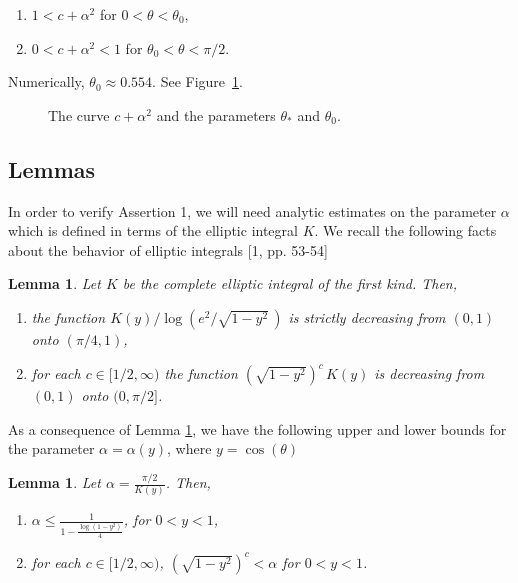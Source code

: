 \documentclass[12pt]{icgft}
\newcommand{\ds}{\displaystyle}
\newtheorem{lemma}[theorem]{Lemma}
\theoremstyle{definition}
\numberwithin{equation}{section}
\begin{document}
\vspace{0.05in}

\begin{enumerate}
\item[d.]$1 < c+\alpha^2$ for $0 < \theta < \theta_0$,

\vspace{0.05in}

\item[e.]$0 < c+\alpha^2 < 1$ for $\theta_0 < \theta < \pi/2$.
\end{enumerate}

\vspace{0.05in}

Numerically, $\theta_0 \approx 0.554$.  See Figure~\ref{F:cpa2}.

\begin{figure}
\begin{center}
\caption{The curve $c+\alpha^2$ and the parameters $\theta_*$ and $\theta_0$.}
\label{F:cpa2}
\end{center}
\end{figure}

\subsection{Lemmas}

In order to verify Assertion 1, we will need analytic estimates on the parameter $\alpha$ which is defined in terms of the elliptic integral $K$. We recall the following facts about the behavior of elliptic integrals [1, pp. 53-54]

\begin{lemma} \label{lem:ei}
Let $K$ be the complete elliptic integral of the first kind.  Then,
\begin{enumerate}
\item the function $K(y)/ \log (e^2/\sqrt{1-y^2}\,)$ is strictly decreasing from $(0,1)$ onto $(\pi/4,1)$,
\item for each $c \in [1/2,\infty)$ the function $(\sqrt{1-y^2})^{c} \,K(y)$ is decreasing from $(0,1)$ onto $(0,\pi/2]$.
\end{enumerate}
\end{lemma}

As a consequence of Lemma \ref{lem:ei}, we have the following upper and lower bounds for the parameter $\alpha = \alpha(y)$, where $y = \cos(\theta)$

\begin{lemma} \label{lem:ba}
Let ${\ds \alpha = \frac{\pi/2}{K(y)} }$.  Then,
\begin{enumerate}
\item ${\ds \alpha \le \frac{1}{1- \frac{\log(1-y^2)}{4} } }$, for $0 < y < 1$,
\item for each $c \in [1/2,\infty)$, $(\sqrt{1-y^2})^{c} < \alpha$ for $0 < y < 1$.
\end{enumerate}
\end{lemma}
\end{document}
